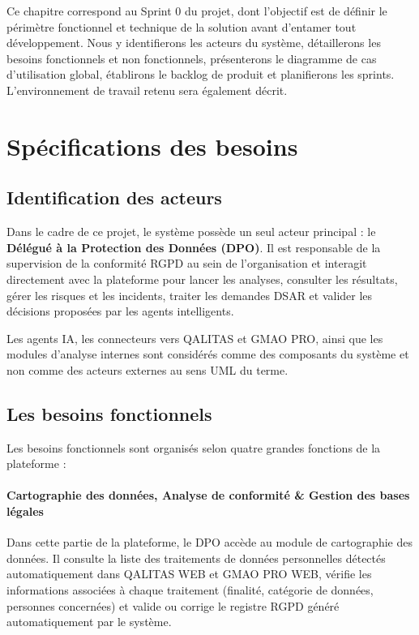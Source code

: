 \documentclass[12pt,a4paper]{report}
\begin{document}
Ce chapitre correspond au Sprint 0 du projet, dont l'objectif est de définir le périmètre fonctionnel et technique de la solution avant d'entamer tout développement. Nous y identifierons les acteurs du système, détaillerons les besoins fonctionnels et non fonctionnels, présenterons le diagramme de cas d'utilisation global, établirons le backlog de produit et planifierons les sprints. L'environnement de travail retenu sera également décrit.

\section{Spécifications des besoins}

\subsection{Identification des acteurs}

Dans le cadre de ce projet, le système possède un seul acteur principal : le \textbf{Délégué à la Protection des Données (DPO)}. Il est responsable de la supervision de la conformité RGPD au sein de l'organisation et interagit directement avec la plateforme pour lancer les analyses, consulter les résultats, gérer les risques et les incidents, traiter les demandes DSAR et valider les décisions proposées par les agents intelligents.

Les agents IA, les connecteurs vers QALITAS et GMAO PRO, ainsi que les modules d'analyse internes sont considérés comme des composants du système et non comme des acteurs externes au sens UML du terme.

\subsection{Les besoins fonctionnels}

Les besoins fonctionnels sont organisés selon quatre grandes fonctions de la plateforme :

\paragraph{Cartographie des données, Analyse de conformité \& Gestion des bases légales}

Dans cette partie de la plateforme, le DPO accède au module de cartographie des données. Il consulte la liste des traitements de données personnelles détectés automatiquement dans QALITAS WEB et GMAO PRO WEB, vérifie les informations associées à chaque traitement (finalité, catégorie de données, personnes concernées) et valide ou corrige le registre RGPD généré automatiquement par le système.
\end{document}
